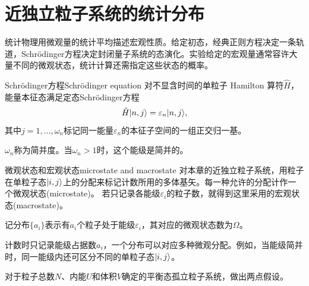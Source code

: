 \chapter{近独立粒子系统的统计分布}

统计物理用微观量的统计平均描述宏观性质。给定初态，经典正则方程决定一条轨道，Schrödinger方程决定封闭量子系统的态演化。实验给定的宏观量通常容许大量不同的微观状态，统计计算还需指定这些状态的概率。


\begin{theorem}
	{Schrödinger方程}{Schrödinger equation}
	对不显含时间的单粒子 Hamilton 算符$\hat H$，能量本征态满足定态Schrödinger方程
	\begin{equation}
		\hat H\lvert n,j\rangle = \varepsilon_n\lvert n,j\rangle,
	\end{equation}
	其中$j = 1,\ldots,\omega_n$标记同一能量$\varepsilon_n$的本征子空间的一组正交归一基。

	$\omega_n$称为简并度。当$\omega_n > 1$时，这个能级是简并的。
\end{theorem}


\begin{definition}
	{微观状态和宏观状态}{microstate and macrostate}
	对本章的近独立粒子系统，用粒子在单粒子态$\lvert i,j\rangle$上的分配来标记计数所用的多体基矢。每一种允许的分配计作一个微观状态(microstate)。
	若只记录各能级$\varepsilon_i$的粒子数，就得到这里采用的宏观状态(macrostate)。

	记分布$\{a_i\}$表示有$a_i$个粒子处于能级$\varepsilon_i$，其对应的微观状态数为$\Omega$。
\end{definition}

\begin{corollary}
	计数时只记录能级占据数$a_i$，一个分布可以对应多种微观分配。例如，当能级简并时，同一能级内还可区分不同的单粒子态$\lvert i,j\rangle$。
\end{corollary}

对于粒子总数$N$、内能$U$和体积$V$确定的平衡态孤立粒子系统，做出两点假设。

